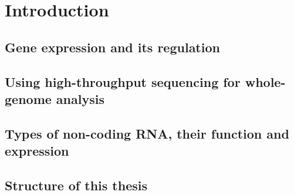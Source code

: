\chapter{Introduction}

\section{Gene expression and its regulation}

\section{Using high-throughput sequencing for whole-genome analysis}

\section{Types of non-coding RNA, their function and expression}

\section{Structure of this thesis}
